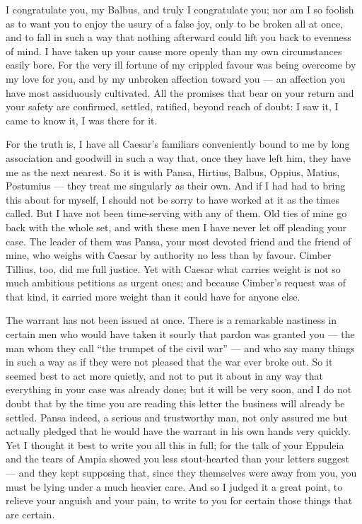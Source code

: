 

 I congratulate you, my Balbus, and truly I congratulate you; nor am I so foolish as to want you to enjoy the usury of a false joy, only to be broken all at once, and to fall in such a way that nothing afterward could lift you back to evenness of mind. I have taken up your cause more openly than my own circumstances easily bore. For the very ill fortune of my crippled favour was being overcome by my love for you, and by my unbroken affection toward you --- an affection you have most assiduously cultivated. All the promises that bear on your return and your safety are confirmed, settled, ratified, beyond reach of doubt: I saw it, I came to know it, I was there for it.

 For the truth is, I have all Caesar's familiars conveniently bound to me by long association and goodwill in such a way that, once they have left him, they have me as the next nearest. So it is with Pansa, Hirtius, Balbus, Oppius, Matius, Postumius --- they treat me singularly as their own. And if I had had to bring this about for myself, I should not be sorry to have worked at it as the times called. But I have not been time-serving with any of them. Old ties of mine go back with the whole set, and with these men I have never let off pleading your case. The leader of them was Pansa, your most devoted friend and the friend of mine, who weighs with Caesar by authority no less than by favour. Cimber Tillius, too, did me full justice. Yet with Caesar what carries weight is not so much ambitious petitions as urgent ones; and because Cimber's request was of that kind, it carried more weight than it could have for anyone else.

 The warrant has not been issued at once. There is a remarkable nastiness in certain men who would have taken it sourly that pardon was granted you --- the man whom they call ``the trumpet of the civil war'' --- and who say many things in such a way as if they were not pleased that the war ever broke out. So it seemed best to act more quietly, and not to put it about in any way that everything in your case was already done; but it will be very soon, and I do not doubt that by the time you are reading this letter the business will already be settled. Pansa indeed, a serious and trustworthy man, not only assured me but actually pledged that he would have the warrant in his own hands very quickly. Yet I thought it best to write you all this in full; for the talk of your Eppuleia and the tears of Ampia showed you less stout-hearted than your letters suggest --- and they kept supposing that, since they themselves were away from you, you must be lying under a much heavier care. And so I judged it a great point, to relieve your anguish and your pain, to write to you for certain those things that are certain.


